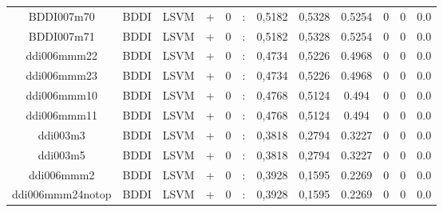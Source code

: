 \documentclass[a4paper]{article}
\begin{document}
\begin{landscape}
\begin{center}
\begin{tabular}{ |c|c|c|c|c|c|c|c|c|c|c|c|}
 	
 
 	
 		
 		\small{ BDDI007m70 } & BDDI & LSVM & +  &  0 &  :  &  0,5182 & 0,5328 & 0.5254  &  0 & 0 & 0.0 \\
 		

 	
 
 	
 		
 		\small{ BDDI007m71 } & BDDI & LSVM & +  &  0 &  :  &  0,5182 & 0,5328 & 0.5254  &  0 & 0 & 0.0 \\
 		

 	
 
 	
 		
 		\small{ ddi006mmm22 } & BDDI & LSVM & +  &  0 &  :  &  0,4734 & 0,5226 & 0.4968  &  0 & 0 & 0.0 \\
 		

 	
 
 	
 		
 		\small{ ddi006mmm23 } & BDDI & LSVM & +  &  0 &  :  &  0,4734 & 0,5226 & 0.4968  &  0 & 0 & 0.0 \\
 		

 	
 
 	
 		
 		\small{ ddi006mmm10 } & BDDI & LSVM & +  &  0 &  :  &  0,4768 & 0,5124 & 0.494  &  0 & 0 & 0.0 \\
 		

 	
 
 	
 		
 		\small{ ddi006mmm11 } & BDDI & LSVM & +  &  0 &  :  &  0,4768 & 0,5124 & 0.494  &  0 & 0 & 0.0 \\
 		

 	
 
 	
 		
 		\small{ ddi003m3 } & BDDI & LSVM & +  &  0 &  :  &  0,3818 & 0,2794 & 0.3227  &  0 & 0 & 0.0 \\
 		

 	
 
 	
 		
 		\small{ ddi003m5 } & BDDI & LSVM & +  &  0 &  :  &  0,3818 & 0,2794 & 0.3227  &  0 & 0 & 0.0 \\
 		

 	
 
 	
 		
 		\small{ ddi006mmm2 } & BDDI & LSVM & +  &  0 &  :  &  0,3928 & 0,1595 & 0.2269  &  0 & 0 & 0.0 \\
 		

 	
 
 	
 		
 		\small{ ddi006mmm24notop } & BDDI & LSVM & +  &  0 &  :  &  0,3928 & 0,1595 & 0.2269  &  0 & 0 & 0.0 \\
 		


\end{tabular}
\end{center}
\end{landscape}
\end{document}
